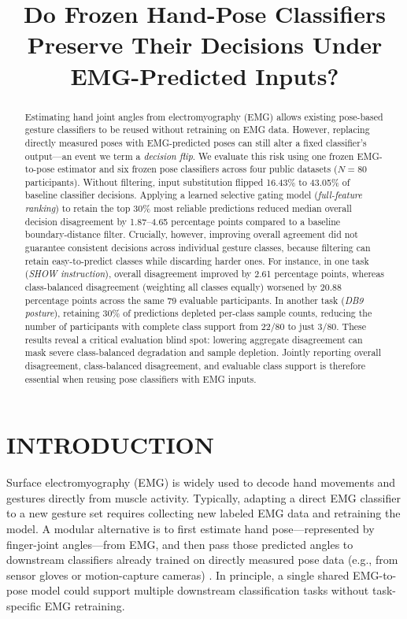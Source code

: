 \documentclass[conference,letterpaper]{IEEEtran}
\title{Do Frozen Hand-Pose Classifiers Preserve Their Decisions Under EMG-Predicted Inputs?}
\author{\IEEEauthorblockN{Boyan Dong}\IEEEauthorblockA{School of Biological Science and Medical Engineering, Southeast University, Nanjing, China\\yan494815@gmail.com}}
\begin{document}
\flushbottom
\maketitle
{}
\begin{abstract}

Estimating hand joint angles from electromyography (EMG) allows existing pose-based gesture classifiers to be reused without retraining on EMG data. However, replacing directly measured poses with EMG-predicted poses can still alter a fixed classifier's output---an event we term a \textit{decision flip}. We evaluate this risk using one frozen EMG-to-pose estimator and six frozen pose classifiers across four public datasets ($N = 80$ participants). Without filtering, input substitution flipped 16.43\% to 43.05\% of baseline classifier decisions. Applying a learned selective gating model (\textit{full-feature ranking}) to retain the top 30\% most reliable predictions reduced median overall decision disagreement by 1.87--4.65 percentage points compared to a baseline boundary-distance filter. Crucially, however, improving overall agreement did not guarantee consistent decisions across individual gesture classes, because filtering can retain easy-to-predict classes while discarding harder ones. For instance, in one task (\textit{SHOW instruction}), overall disagreement improved by 2.61 percentage points, whereas class-balanced disagreement (weighting all classes equally) worsened by 20.88 percentage points across the same 79 evaluable participants. In another task (\textit{DB9 posture}), retaining 30\% of predictions depleted per-class sample counts, reducing the number of participants with complete class support from 22/80 to just 3/80. These results reveal a critical evaluation blind spot: lowering aggregate disagreement can mask severe class-balanced degradation and sample depletion. Jointly reporting overall disagreement, class-balanced disagreement, and evaluable class support is therefore essential when reusing pose classifiers with EMG inputs.

\end{abstract}

\section{INTRODUCTION}

Surface electromyography (EMG) is widely used to decode hand movements and gestures directly from muscle activity. Typically, adapting a direct EMG classifier to a new gesture set requires collecting new labeled EMG data and retraining the model. A modular alternative is to first estimate hand pose---represented by finger-joint angles---from EMG, and then pass those predicted angles to downstream classifiers already trained on directly measured pose data (e.g., from sensor gloves or motion-capture cameras) \cite{ref1}. In principle, a single shared EMG-to-pose model could support multiple downstream classification tasks without task-specific EMG retraining.
\end{document}
